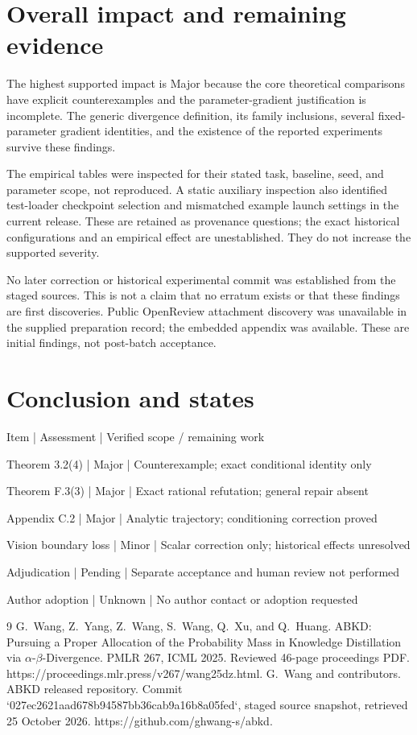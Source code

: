 \documentclass[10pt]{article}
\begin{document}
\section*{Overall impact and remaining evidence}
The highest supported impact is Major because the core theoretical comparisons have explicit counterexamples and the parameter-gradient justification is incomplete. The generic divergence definition, its family inclusions, several fixed-parameter gradient identities, and the existence of the reported experiments survive these findings.\par
The empirical tables were inspected for their stated task, baseline, seed, and parameter scope, not reproduced. A static auxiliary inspection also identified test-loader checkpoint selection and mismatched example launch settings in the current release. These are retained as provenance questions; the exact historical configurations and an empirical effect are unestablished. They do not increase the supported severity.\par
No later correction or historical experimental commit was established from the staged sources. This is not a claim that no erratum exists or that these findings are first discoveries. Public OpenReview attachment discovery was unavailable in the supplied preparation record; the embedded appendix was available. These are initial findings, not post-batch acceptance.\par
\section*{Conclusion and states}
Item | Assessment | Verified scope / remaining work\par
Theorem 3.2(4) | Major | Counterexample; exact conditional identity only\par
Theorem F.3(3) | Major | Exact rational refutation; general repair absent\par
Appendix C.2 | Major | Analytic trajectory; conditioning correction proved\par
Vision boundary loss | Minor | Scalar correction only; historical effects unresolved\par
Adjudication | Pending | Separate acceptance and human review not performed\par
Author adoption | Unknown | No author contact or adoption requested\par
9 G. Wang, Z. Yang, Z. Wang, S. Wang, Q. Xu, and Q. Huang. ABKD: Pursuing a Proper Allocation of the Probability Mass in Knowledge Distillation via \(\alpha\)-\(\beta\)-Divergence. PMLR 267, ICML 2025. Reviewed 46-page proceedings PDF. https://proceedings.mlr.press/v267/wang25dz.html. G. Wang and contributors. ABKD released repository. Commit `027ec2621aad678b94587bb36cab9a16b8a05fed`, staged source snapshot, retrieved 25 October 2026. https://github.com/ghwang-s/abkd.\par
\end{document}
